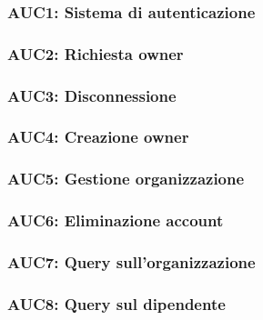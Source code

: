 \documentclass[../analisi-dei-requisiti.tex]{subfiles}
\begin{document}
\subsubsection{AUC1: Sistema di autenticazione}%
\label{subs:AUC1}



\subsubsection{AUC2: Richiesta owner}%
\label{subs:AUC2}



\subsubsection{AUC3: Disconnessione}%
\label{subs:AUC3}



\subsubsection{AUC4: Creazione owner}%
\label{subs:AUC4}



\subsubsection{AUC5: Gestione organizzazione}%
\label{subs:AUC5}



\subsubsection{AUC6: Eliminazione account}%
\label{subs:AUC6}



\subsubsection{AUC7: Query sull'organizzazione}%
\label{subs:AUC7}



\subsubsection{AUC8: Query sul dipendente}%
\label{subs:AUC8}
\end{document}
